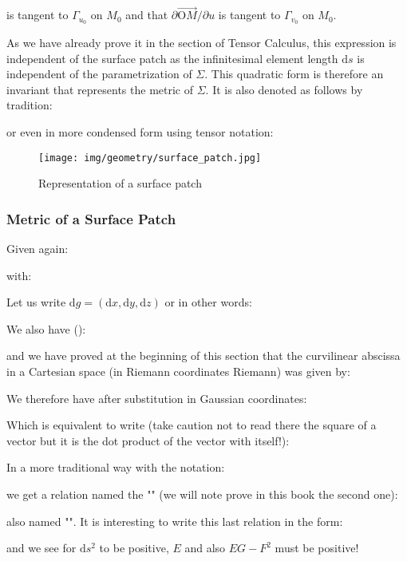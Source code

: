 {	is tangent to $\Gamma_{u_0}$ on $M_0$ and that $\partial \overrightarrow{\text{O}M}/\partial u$ is tangent to $\Gamma_{v_0}$ on $M_0$.
	
	As we have already prove it in the section of Tensor Calculus, this expression is independent of the surface patch as the infinitesimal  element length $\mathrm{d}s$ is independent of the parametrization of $\Sigma$. This quadratic form is therefore an invariant that represents the metric of $\Sigma$. It is also denoted as follows by tradition:
	
	or even in more condensed form using tensor notation:
	
	
	\begin{figure}[H]
		\centering
		\texttt{[image: img/geometry/surface\_patch.jpg]}
		\caption{Representation of a surface patch}
	\end{figure}
	
	\subsubsection{Metric of a Surface Patch}
	Given again:
	
	with:
	
	Let us write $\mathrm{d}g=(\mathrm{d}x,\mathrm{d}y,\mathrm{d}z)$ or in other words:
	
	We also have ():
	
	and we have proved at the beginning of this section that the curvilinear abscissa in a Cartesian space (in Riemann coordinates Riemann) was given by:
	
	We therefore have after substitution in Gaussian coordinates:
	
	Which is equivalent to write (take caution not to read there the square of a vector but it is the dot product of the vector with itself!):
	
	In a more traditional way with the notation:
	
	we get a relation named the "" (we will note prove in this book the second one):
	
	also named "". It is interesting to write this last relation in the form:
	
	and we see for $\mathrm{d}s^2$ to be positive, $E$ and also $EG-F^2$ must be positive!
	
}
